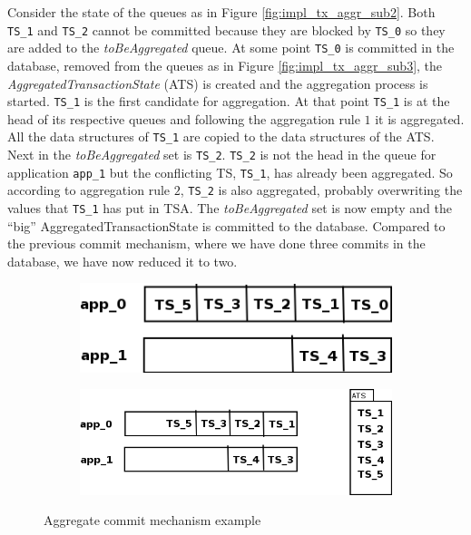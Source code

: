Consider the state of the queues as in Figure
\ref{fig:impl_tx_aggr_sub2}. Both \texttt{TS\_1} and \texttt{TS\_2}
cannot be committed because they are blocked by \texttt{TS\_0} so they
are added to the \emph{toBeAggregated} queue. At some
point \texttt{TS\_0} is committed in the database, removed from the
queues as in Figure \ref{fig:impl_tx_aggr_sub3}, the
\emph{AggregatedTransactionState} (ATS) is created
and the aggregation process is started. \texttt{TS\_1} is the first
candidate for aggregation. At that point \texttt{TS\_1} is at the head
of its respective queues and following the aggregation rule $1$ it is
aggregated. All the data structures of \texttt{TS\_1} are copied to
the data structures of the ATS. Next in the \emph{toBeAggregated} set
is \texttt{TS\_2}. \texttt{TS\_2} is not the head in the queue for
application \texttt{app\_1} but the conflicting TS, \texttt{TS\_1}, has
already been aggregated. So according to aggregation rule $2$,
\texttt{TS\_2} is also aggregated, probably overwriting the values that
\texttt{TS\_1} has put in TSA. The \emph{toBeAggregated} set is now
empty and the ``big'' AggregatedTransactionState is committed to the
database. Compared to the previous commit mechanism, where we have
done three commits in the database, we have now reduced it to two.

\begin{figure}
\centering
\begin{subfigure}[t]{0.3\textwidth}
\includegraphics[scale=0.4]{resources/images/Implementation/commit_system_aggr_example.png}
\caption{}
\label{fig:impl_tx_aggr_ex0}
\end{subfigure}

\begin{subfigure}[t]{0.3\textwidth}
  \includegraphics[scale=0.4]{resources/images/Implementation/commit_system_aggr_example_1.png}
  \caption{}
  \label{fig:impl_tx_aggr_ex1}
\end{subfigure}
\caption{Aggregate commit mechanism example}
\label{fig:impl_tx_aggr_example}
\end{figure}

